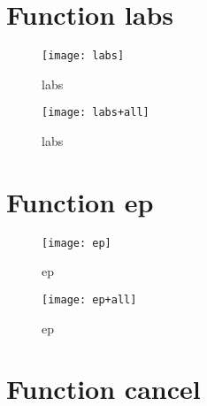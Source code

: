 \newpage

\section{Function labs}

\begin{center}

\end{center}

\begin{figure}[h]
\begin{center}
\texttt{[image: labs]}
\caption{labs}
\end{center}
\end{figure}

\begin{figure}[h]
\begin{center}
\texttt{[image: labs+all]}
\caption{labs}
\end{center}
\end{figure}

\newpage

\section{Function ep}

\begin{center}

\end{center}

\begin{figure}[h]
\begin{center}
\texttt{[image: ep]}
\caption{ep}
\end{center}
\end{figure}

\begin{figure}[h]
\begin{center}
\texttt{[image: ep+all]}
\caption{ep}
\end{center}
\end{figure}

\newpage

\section{Function cancel}

\begin{center}

\end{center}

